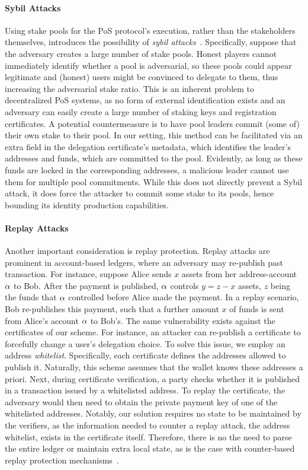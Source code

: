 \paragraph{Sybil Attacks}
Using stake pools for the PoS protocol's execution, rather than the
stakeholders themselves, introduces the possibility of \emph{sybil
attacks}~\cite{douceur2002sybil}. Specifically, suppose that the adversary
creates a large number of stake pools. Honest players cannot immediately
identify whether a pool is adversarial, so these pools could appear legitimate
and (honest) users might be convinced to delegate to them, thus increasing the
adversarial stake ratio. This is an inherent problem to decentralized PoS
systems, as no form of external identification exists and an adversary can
easily create a large number of staking keys and registration certificates. A
potential countermeasure is to have pool leaders commit (some of) their own
stake to their pool.  In our setting, this method can be facilitated via an
extra field in the delegation certificate's metadata, which identifies the
leader's addresses and funds, which are committed to the pool. Evidently, as
long as these funds are locked in the corresponding addresses, a malicious
leader cannot use them for multiple pool commitments. While this does not
directly prevent a Sybil attack, it does force the attacker to commit some
stake to its pools, hence bounding its identity production capabilities.

\paragraph{Replay Attacks}
Another important consideration is replay protection. Replay attacks are
prominent in account-based ledgers, where an adversary may re-publish past
transaction. For instance, suppose Alice sends $x$ assets from her
address-account $\alpha$ to Bob. After the payment is published, $\alpha$
controls $y = z - x$ assets, $z$ being the funds that $\alpha$ controlled before
Alice made the payment. In a replay scenario, Bob re-publishes this payment,
such that a further amount $x$ of funds is sent from Alice's account $\alpha$ to
Bob's. The same vulnerability exists against the certificates of our scheme.
For instance, an attacker can re-publish a certificate to forcefully change a
user's delegation choice. To solve this issue, we employ an address
\emph{whitelist}. Specifically, each certificate defines the addresses allowed
to publish it. Naturally, this scheme assumes that the wallet knows these
addresses a priori.  Next, during certificate verification, a party checks
whether it is published in a transaction issued by a whitelisted address.  To
replay the certificate, the adversary would then need to obtain the private
payment key of one of the whitelisted addresses. Notably, our solution requires
no state to be maintained by the verifiers, as the information needed to
counter a replay attack, \ie the address whitelist, exists in the certificate
itself. Therefore, there is no the need to parse the entire ledger or maintain
extra local state, as is the case with counter-based replay protection
mechanisms~\cite{ethereumReplay}.
